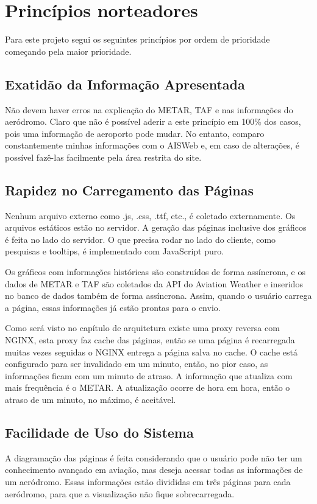 \chapter{Princípios norteadores}

Para este projeto segui os seguintes princípios por ordem de prioridade começando
pela maior prioridade.

\section{Exatidão da Informação Apresentada}
Não devem haver erros na explicação do METAR, TAF e nas informações do aeródromo. 
Claro que não é possível aderir a este princípio em 100\% dos casos, pois uma 
informação de aeroporto pode mudar. No entanto, comparo constantemente minhas 
informações com o AISWeb e, em caso de alterações, é possível fazê-las facilmente
pela área restrita do site.

\section{Rapidez no Carregamento das Páginas} Nenhum arquivo externo como .js, 
.css, .ttf, etc., é coletado externamente. Os arquivos estáticos estão no servidor. 
A geração das páginas inclusive dos gráficos é feita no lado do servidor. O que 
precisa rodar no lado do cliente, como pesquisas e tooltips, é implementado com 
JavaScript puro.

Os gráficos com informações históricas são construídos de forma assíncrona, e os
dados de METAR e TAF são coletados da API do Aviation Weather e inseridos no
banco de dados também de forma assíncrona. Assim, quando o usuário carrega a 
página, essas informações já estão prontas para o envio.

Como será visto no capítulo de arquitetura existe uma proxy reversa com NGINX,
esta proxy faz cache das páginas, então se uma página é recarregada muitas vezes
seguidas o NGINX entrega a página salva no cache. O cache está configurado para
ser invalidado em um minuto, então, no pior caso, as informações ficam com um 
minuto de atraso. A informação que atualiza com mais frequência é o METAR. A
atualização ocorre de hora em hora, então o atraso de um minuto, no máximo, é
aceitável.

\section{Facilidade de Uso do Sistema} A diagramação das páginas é feita
considerando que o usuário pode não ter um conhecimento avançado em aviação, mas
deseja acessar todas as informações de um aeródromo. Essas informações estão 
divididas em três páginas para cada aeródromo, para que a visualização não fique 
sobrecarregada.

